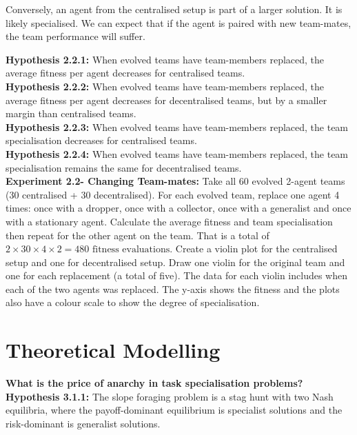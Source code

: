 \documentclass[12pt]{article}
\begin{document}
Conversely, an agent from the centralised setup is part of a larger solution. It is likely specialised. We can expect that if the agent is paired with new team-mates, the team performance will suffer. 

\textbf{Hypothesis 2.2.1:} When evolved teams have team-members replaced, the average fitness per agent decreases for centralised teams.\\

\textbf{Hypothesis 2.2.2:} When evolved teams have team-members replaced, the average fitness per agent decreases for decentralised teams, but by a smaller margin than centralised teams.\\

\textbf{Hypothesis 2.2.3:} When evolved teams have team-members replaced, the team specialisation decreases for centralised teams.\\

\textbf{Hypothesis 2.2.4:} When evolved teams have team-members replaced, the team specialisation remains the same for decentralised teams.\\

\textbf{Experiment 2.2- Changing Team-mates:} Take all 60 evolved 2-agent teams (30 centralised + 30 decentralised).
For each evolved team, replace one agent 4 times: once with a dropper, once with a collector, once with a generalist and once with a stationary agent.
Calculate the average fitness and team specialisation then repeat for the other agent on the team.
That is a total of $2 \times 30 \times 4 \times 2= 480 \mbox{ fitness evaluations}$. 
Create a violin plot for the centralised setup and one for decentralised setup.
Draw one violin for the original team and one for each replacement (a total of five).
The data for each violin includes when each of the two agents was replaced.
The y-axis shows the fitness and the plots also have a colour scale to show the degree of specialisation.\\

\section{Theoretical Modelling}

\textbf{What is the price of anarchy in task specialisation problems?}\\

\textbf{Hypothesis 3.1.1:} The slope foraging problem is a stag hunt with two Nash equilibria, where the payoff-dominant equilibrium is specialist solutions and the risk-dominant is generalist solutions.\\
\end{document}
